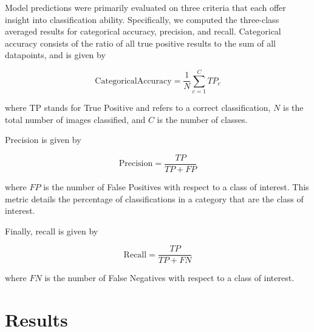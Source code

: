 Model predictions were primarily evaluated on three criteria that each offer insight into classification ability.
Specifically, we computed the three-class averaged results for categorical accuracy, precision, and recall.
Categorical accuracy consists of the ratio of all true positive results to the sum of all datapoints, and is given by

\begin{equation}
\mathrm{Categorical Accuracy} = \frac{1}{N}\sum_{c=1}^{C}TP_c
\end{equation}

where TP stands for True Positive and refers to a correct classification, $N$ is the total number of images classified, and $C$ is the number of classes.

Precision is given by

\begin{equation}
\mathrm{Precision} = \frac{TP}{TP+FP}
\end{equation}

where $FP$ is the number of False Positives with respect to a class of interest.
This metric details the percentage of classifications in a category that are the class of interest.

Finally, recall is given by

\begin{equation}
\mathrm{Recall} = \frac{TP}{TP+FN}
\end{equation}

where $FN$ is the number of False Negatives with respect to a class of interest.


\section{Results}
\label{sec:bestmodel_results}

